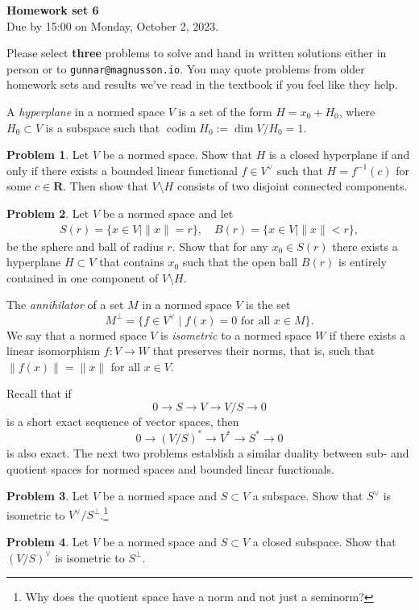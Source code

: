 \documentclass[11pt]{article}
\theoremstyle{definition}
\newtheorem{prob}{Problem}
\newcommand{\kk}[1]{\mathbf{#1}}
\def\norm#1{\| #1 \|}
\DeclareMathOperator{\codim}{codim}
\def\head{
\begin{center}
\textbf{\LARGE Homework set 6}
\\[3pt]
Due by 15:00 on Monday, October 2, 2023.
\end{center}
\medskip
}
\begin{document}
\head

Please select \textbf{three} problems to solve and hand in written solutions
either in person or to \verb+gunnar@magnusson.io+. You may quote problems from
older homework sets and results we've read in the textbook if you feel like
they help.

A \emph{hyperplane} in a normed space $V$ is a set of the form $H = x_0 + H_0$,
where $H_0 \subset V$ is a subspace such that $\codim H_0 := \dim V / H_0 = 1$.

\begin{prob}
Let $V$ be a normed space.
Show that $H$ is a closed hyperplane if and only if there exists a bounded
linear functional $f \in V^\vee$ such that $H = f^{-1}(c)$ for some $c \in \kk R$.
Then show that $V \setminus H$ consists of two disjoint connected components.
\end{prob}

\begin{prob}
Let $V$ be a normed space and let
\begin{align*}
S(r) = \{ x \in V \mid \norm{x} = r \},
\quad
B(r) = \{ x \in V \mid \norm{x} < r \},
\end{align*}
be the sphere and ball of radius $r$.
Show that for any $x_0 \in S(r)$ there exists a hyperplane $H \subset V$ that
contains $x_0$ such that the open ball $B(r)$ is
entirely contained in one component of $V \setminus H$.
\end{prob}

The \emph{annihilator} of a set $M$ in a normed space $V$ is the set
\[
M^{\perp} = \{ f \in V^\vee \mid \text{$f(x) = 0$ for all $x \in M$} \}.
\]
We say that a normed space $V$ is \emph{isometric} to a normed space $W$ if
there exists a linear isomorphism $f : V \to W$ that preserves their norms,
that is, such that $\norm{f(x)} = \norm{x}$ for all $x \in V$.

Recall that if
\[
0 \longrightarrow S \longrightarrow V \longrightarrow V/S \longrightarrow 0
\]
is a short exact sequence of vector spaces, then
\[
0 \longrightarrow (V/S)^* \longrightarrow V^* \longrightarrow S^* \longrightarrow 0
\]
is also exact.
The next two problems establish a similar duality between sub- and quotient
spaces for normed spaces and bounded linear functionals.

\begin{prob}
Let $V$ be a normed space and $S \subset V$ a subspace.
Show that $S^\vee$ is isometric to $V^\vee / S^\perp$.\footnote{Why does the quotient space have a norm and not just a seminorm?}
\end{prob}

\begin{prob}
Let $V$ be a normed space and $S \subset V$ a closed subspace.
Show that $(V / S)^\vee$ is isometric to $S^\perp$.
\end{prob}
\end{document}

